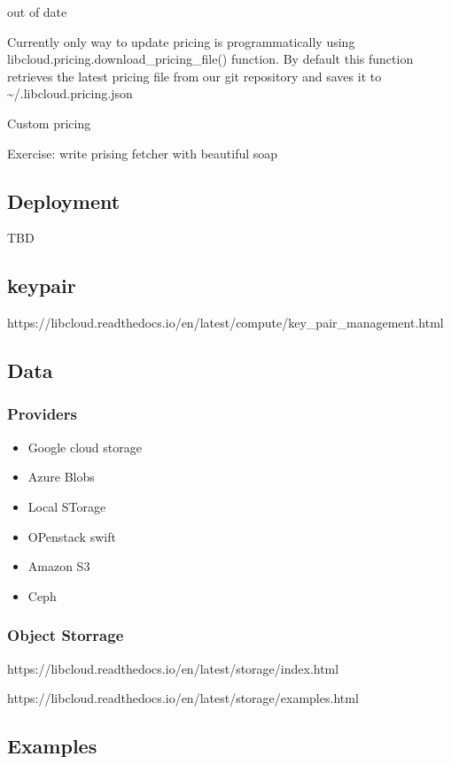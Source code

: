out of date

Currently only way to update pricing is programmatically using
libcloud.pricing.download\_pricing\_file() function. By default this
function retrieves the latest pricing file from our git repository and
saves it to \textasciitilde{}/.libcloud.pricing.json

Custom pricing

Exercise: write prising fetcher with beautiful soap

\subsection{Deployment}

TBD

\subsection{keypair}

https://libcloud.readthedocs.io/en/latest/compute/key\_pair\_management.html

\subsection{Data}

\subsubsection{Providers}

\begin{itemize}
\item
  Google cloud storage
\item
  Azure Blobs
\item
  Local STorage
\item
  OPenstack swift
\item
  Amazon S3
\item
  Ceph
\end{itemize}

\subsubsection{Object Storrage}

https://libcloud.readthedocs.io/en/latest/storage/index.html

https://libcloud.readthedocs.io/en/latest/storage/examples.html

\subsection{Examples}

